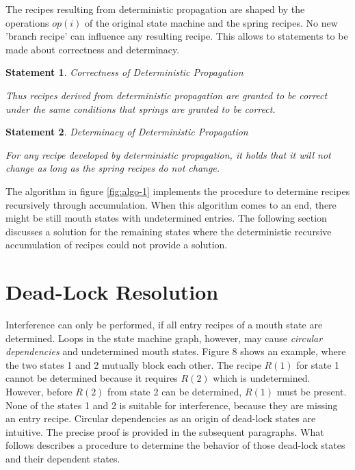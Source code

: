 \documentclass[12pt,a4paper]{scrartcl}
\newtheorem{statement}{Statement}
\begin{document}
The recipes resulting from deterministic propagation are shaped by the 
operations $op(i)$ of the original state machine and the spring recipes. No
new 'branch recipe' can influence any resulting recipe. This allows to 
statements to be made about correctness and determinacy.

\begin{statement} Correctness of Deterministic Propagation \label{stm:correctness-rule}
    
    Thus recipes derived from deterministic propagation are granted
    to be correct under the same conditions that springs are granted to be
    correct.

\end{statement}

\begin{statement} Determinacy of Deterministic Propagation \label{stm:determinacy-rule}

    For any recipe developed by deterministic propagation, it holds that it 
    will not change as long as the spring recipes do not change.

\end{statement}


The algorithm in figure \ref{fig:algo-1} implements the procedure to determine
recipes recursively through accumulation.  When this algorithm comes to an end,
there might be still mouth states with undetermined entries.  The following
section discusses a solution for the remaining states where the deterministic
recursive accumulation of recipes could not provide a solution.

%
\section{Dead-Lock Resolution}

Interference can only be performed, if all entry recipes of a mouth state are
determined. Loops in the state machine graph, however, may cause
\textit{circular dependencies} and undetermined mouth states.  Figure 8 shows
an example, where the two states 1 and 2 mutually block each other. The recipe
$R(1)$ for state 1 cannot be determined because it requires $R(2)$ which is
undetermined. However, before $R(2)$ from state 2 can be determined, $R(1)$
must be present. None of the states 1 and 2 is suitable for interference,
because they are missing an entry recipe.  Circular dependencies as an origin
of dead-lock states are intuitive. The precise proof is provided in the
subsequent paragraphs. What follows describes a procedure to determine the
behavior of those dead-lock states and their dependent states.
\end{document}
